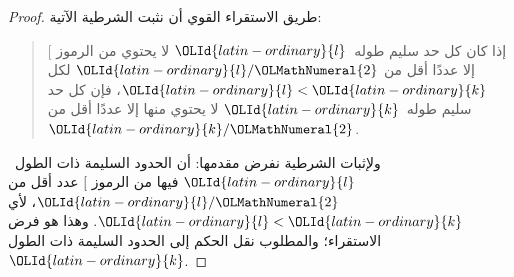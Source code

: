 \documentclass[../../../include/open-logic-section]{subfiles}
\begin{document}
\begin{proof}
طريق الاستقراء القوي أن نثبت الشرطية الآتية:
\begin{quote}
  إذا كان كل حد سليم طوله~${\OLId{latin-ordinary}{l}}$ لا يحتوي من الرموز $[$ إلا عددًا أقل من
  ${\OLId{latin-ordinary}{l}}/{\OLMathNumeral{2}}$ لكل ${\OLId{latin-ordinary}{l}} < {\OLId{latin-ordinary}{k}}$، فإن كل حد سليم طوله~${\OLId{latin-ordinary}{k}}$ لا يحتوي منها إلا
  عددًا أقل من ${\OLId{latin-ordinary}{k}}/{\OLMathNumeral{2}}$.
\end{quote}
ولإثبات الشرطية نفرض مقدمها: أن الحدود السليمة ذات الطول~${\OLId{latin-ordinary}{l}}$ فيها من
الرموز $[$ عدد أقل من ${\OLId{latin-ordinary}{l}}/{\OLMathNumeral{2}}$، لأي ${\OLId{latin-ordinary}{l}}<{\OLId{latin-ordinary}{k}}$. وهذا هو فرض الاستقراء؛
والمطلوب نقل الحكم إلى الحدود السليمة ذات الطول~${\OLId{latin-ordinary}{k}}$.


\end{proof}
\end{document}
